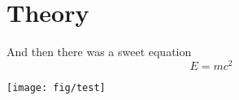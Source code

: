 \chapter{Theory}
And then there was a sweet equation
\begin{equation}
E=mc^2
\end{equation}

\texttt{[image: fig/test]}
